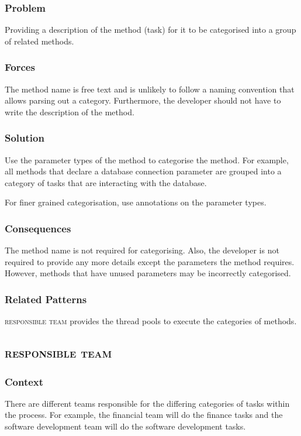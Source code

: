 \documentclass[prodmode]{style/acmlarge}
\begin{document}
\subsubsection*{Problem} Providing a description of the method (task) for it to be
categorised into a group of related methods.

\subsubsection*{Forces} The method name is free text and is unlikely to follow a
naming convention that allows parsing out a category.  Furthermore, the
developer should not have to write the description of the method.

\subsubsection*{Solution} Use the parameter types of the method to categorise
the method.  For example, all methods that declare a database connection
parameter are grouped into a category of tasks that are interacting with the
database.

For finer grained categorisation, use annotations on the parameter types.

\subsubsection*{Consequences} The method name is not required for categorising.
Also, the developer is not required to provide any more details except the
parameters the method requires.  However, methods that have unused parameters
may be incorrectly categorised.

\subsubsection*{Related Patterns} \textsc{responsible team} provides the thread
pools to execute the categories of methods.



\subsection{\textsc{\textbf{responsible team}}}

\subsubsection*{Context} There are different teams responsible for the differing
categories of tasks within the process.  For example, the financial team will do
the finance tasks and the software development team will do the software
development tasks.
\end{document}
